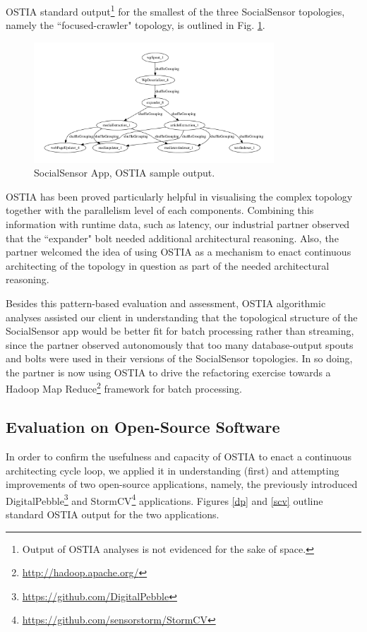 OSTIA standard output\footnote{Output of OSTIA analyses is not evidenced for the
sake of space.} for the smallest of the three SocialSensor topologies, namely
the ``focused-crawler" topology, is outlined in Fig. \ref{topo1}.

\begin{figure}[H]
		\includegraphics[width=9cm]{images/output/focused_crawler}
		\caption{SocialSensor App, OSTIA sample output.}
		\label{topo1}
\end{figure}

OSTIA has been proved particularly helpful in visualising the complex topology
together with the parallelism level of each components. Combining this
information with runtime data, such as latency, our industrial partner observed
that the ``expander" bolt needed additional architectural reasoning. Also, the
partner welcomed the idea of using OSTIA as a mechanism to enact continuous
architecting of the topology in question as part of the needed architectural
reasoning.

Besides this pattern-based evaluation and assessment, OSTIA algorithmic analyses
assisted our client in understanding that the topological structure of the
SocialSensor app would be better fit for batch processing rather than streaming,
since the partner observed autonomously that too many database-output spouts and
bolts were used in their versions of the SocialSensor topologies. In so doing,
the partner is now using OSTIA to drive the refactoring exercise towards a
Hadoop Map Reduce\footnote{\url{http://hadoop.apache.org/}} framework for batch
processing.

\subsection{Evaluation on Open-Source Software}\label{os}

In order to confirm the usefulness and capacity of OSTIA to enact a continuous
architecting cycle loop, we applied it in understanding (first) and attempting
improvements of two open-source applications, namely, the previously introduced
DigitalPebble\footnote{\url{https://github.com/DigitalPebble}} and
StormCV\footnote{\url{https://github.com/sensorstorm/StormCV}}
applications. Figures \ref{dp} and \ref{scv} outline standard OSTIA output for
the two applications.

